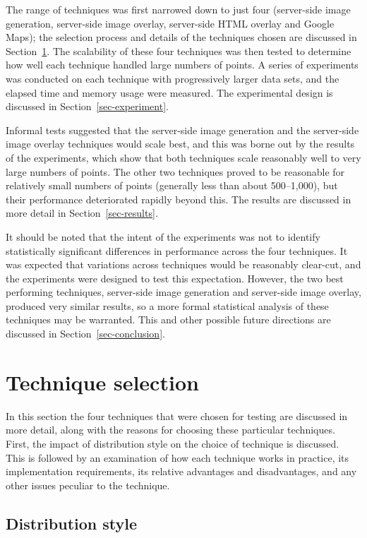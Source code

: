 \documentclass[acmnow]{acmtrans2m}
\begin{document}
The range of techniques was first narrowed down to just four
(server-side image generation, server-side image overlay, server-side
HTML overlay and Google Maps); the selection process and details of the
techniques chosen are discussed in Section~\ref{sec-techniques}. The
scalability of these four techniques was then tested to determine how
well each technique handled large numbers of points. A series of
experiments was conducted on each technique with progressively larger
data sets, and the elapsed time and memory usage were measured. The
experimental design is discussed in Section~\ref{sec-experiment}.

Informal tests suggested that the server-side image generation and the
server-side image overlay techniques would scale best, and this was
borne out by the results of the experiments, which show that both
techniques scale reasonably well to very large numbers of points. The
other two techniques proved to be reasonable for relatively small
numbers of points (generally less than about 500--1,000), but their
performance deteriorated rapidly beyond this. The results are discussed
in more detail in Section~\ref{sec-results}.

It should be noted that the intent of the experiments was not to
identify statistically significant differences in performance across the
four techniques. It was expected that variations across techniques would
be reasonably clear-cut, and the experiments were designed to test this
expectation. However, the two best performing techniques, server-side
image generation and server-side image overlay, produced very similar
results, so a more formal statistical analysis of these techniques may
be warranted. This and other possible future directions are discussed in
Section~\ref{sec-conclusion}.


\section{Technique selection}
\label{sec-techniques}

In this section the four techniques that were chosen for testing are
discussed in more detail, along with the reasons for choosing these
particular techniques. First, the impact of distribution style on the
choice of technique is discussed. This is followed by an examination of
how each technique works in practice, its implementation requirements,
its relative advantages and disadvantages, and any other issues peculiar
to the technique.


\subsection{Distribution style}
\label{sec-distribution}
\end{document}
